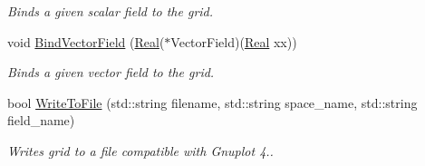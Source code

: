 \begin{DoxyCompactItemize}
\begin{DoxyCompactList}\small\item\em Binds a given scalar field to the grid. \end{DoxyCompactList}\item 
void \hyperlink{classmtk_1_1UniStgGrid1D_a5703f1f875f52f6de8f7db5a6250fafa}{Bind\-Vector\-Field} (\hyperlink{group__c01-roots_gac080bbbf5cbb5502c9f00405f894857d}{Real}($\ast$Vector\-Field)(\hyperlink{group__c01-roots_gac080bbbf5cbb5502c9f00405f894857d}{Real} xx))
\begin{DoxyCompactList}\small\item\em Binds a given vector field to the grid. \end{DoxyCompactList}\item 
bool \hyperlink{classmtk_1_1UniStgGrid1D_aec52d35ba7edc062ae4e8848ef1336ff}{Write\-To\-File} (std\-::string filename, std\-::string space\-\_\-name, std\-::string field\-\_\-name)
\begin{DoxyCompactList}\small\item\em Writes grid to a file compatible with Gnuplot 4.. \end{DoxyCompactList}\end{DoxyCompactItemize}
